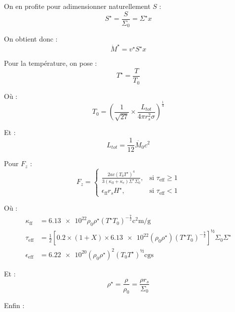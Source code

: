 On en profite pour adimensionner naturellement $S$ :
\begin{equation}
    S^\star = \frac{S}{\Sigma_0} = \Sigma^\star x
\end{equation}

On obtient donc :
\begin{equation}
    \dot{M}^\star = v^\star S^\star x
\end{equation}

Pour la température, on pose :
\begin{equation}
    T^{\star} = \frac{T}{T_0}
\end{equation}

Où :
\begin{equation}
    T_0 = \left(\frac{1}{\sqrt{27}} × \frac{L_{tot}}{4 \pi r_s^2 \sigma} \right)^{\frac{1}{4}}
\end{equation}

Et :
\begin{equation}
    L_{tot} = \frac{1}{12} \dot{M_0} c^2
\end{equation}

Pour $F_z$ :
\begin{equation}
    F_z =
    \begin{cases}
        \frac{2 a c \left(T_0 T^\star\right)^4}{3 (\kappa_\mathrm{ff} + \kappa_e)\Sigma^\star \Sigma_0}, &\text{si $\tau_\mathrm{eff} \geq 1$} \\
        \epsilon_\mathrm{ff} r_s H^\star, &\text{si $\tau_\mathrm{eff} < 1$}
    \end{cases}
\end{equation}

Où :
\begin{align}
    \kappa_\mathrm{ff} &= \num{6.13e22} \rho_0 \rho^\star \left(T^\star T_0\right)^{-\frac{7}{2}} \si{\square\centi\meter\per\gram} \\
    \tau_\mathrm{eff} &= \frac{1}{2} \left[ \num{0.2} × (1 + X) × \num{6.13e22} \left(\rho_0 \rho^\star\right) \left(T^\star T_0\right)^{-\frac{7}{2}} \right]^½ \Sigma_0 \Sigma^\star \\
    \epsilon_\mathrm{eff} &= \num{6.22e20} (\rho_0 \rho^\star)^2 (T_0 T^\star)^½ \text{cgs}
\end{align}

Et :
\begin{equation}
    \rho^\star = \frac{\rho}{\rho_0} = \frac{\rho r_s}{\Sigma_0}
\end{equation}

Enfin :

